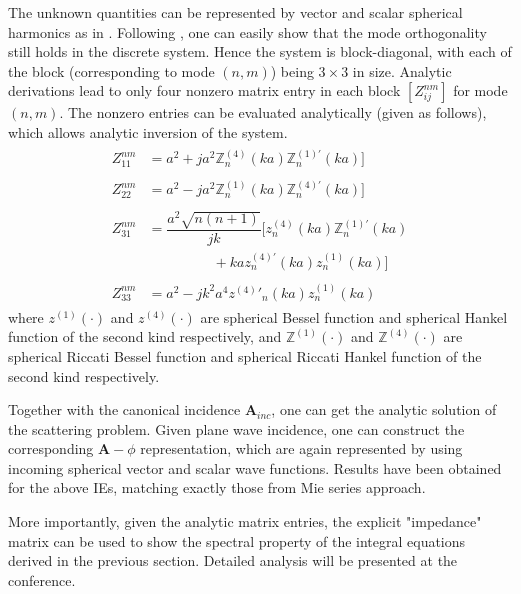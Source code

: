 \documentclass[conference]{IEEEtran}
\begin{document}
The unknown quantities can be represented by vector and scalar spherical harmonics as in \cite{Li2015}.
Following \cite{Li2015}, one can easily show that the mode orthogonality still holds in the discrete system. Hence the system is block-diagonal, with each of the block (corresponding to mode $(n,m)$) being $3 \times 3$ in size. 
Analytic derivations lead to only four nonzero matrix entry in each block $ [Z^{nm}_{ij}]$ for mode $(n,m)$. The nonzero entries can be evaluated analytically (given as follows), which allows analytic inversion of the system. 
\begin{subequations}
\begin{align}
\begin{split}
Z_{11}^{nm}& 
=  a^2 + ja^2  \mathbb{Z}_{n}^{(4)}(ka)  \mathbb{Z}_{n}^{(1)'}(ka) ]  
\end{split}  \\
 \begin{split}
Z_{22}^{nm}& 
= a^2 -  ja^2   \mathbb{Z}_{n}^{(1)}(ka)  \mathbb{Z}_{n}^{(4)'}(ka) ] 
 \end{split} \\
 \begin{split}
Z_{31}^{nm}& 
=  \dfrac{a^2\sqrt{n(n+1)}}{jk}\Big[ z_n^{(4)}(ka) \mathbb{Z}_n^{(1)'}(ka)  \\
& ~~~~~~~~~~~~~~~~~~~~~ + ka z_n^{(4)'}(ka)z_n^{(1)}(ka)\Big]
 \end{split}\\
  \begin{split}
Z_{33}^{nm}& 
= a^2 -jk^2a^4  {z^{(4)}}'_n(ka) z^{(1)}_n(ka)  
 \end{split}
\end{align}
\end{subequations}
where $z^{(1)}(\cdot)$ and $z^{(4)}(\cdot)$ are spherical Bessel function and spherical Hankel function of the second kind respectively, and $\mathbb{Z}^{(1)}(\cdot)$ and $\mathbb{Z}^{(4)}(\cdot)$ are spherical Riccati Bessel function and spherical Riccati Hankel function of the second kind respectively. 

Together with the canonical incidence  $\mathbf{A}_{inc}$, one can get the analytic solution of the scattering problem. Given plane wave incidence, one can construct the corresponding $\mathbf{A}-\phi$ representation, which are again represented by using incoming spherical vector and scalar wave functions. Results have been obtained for the above IEs,  matching exactly those from Mie series approach.

More importantly, given the analytic matrix entries, the explicit "impedance" matrix can be used to show the spectral property of the integral equations derived in the previous section. Detailed analysis will be presented at the conference.
\end{document}
